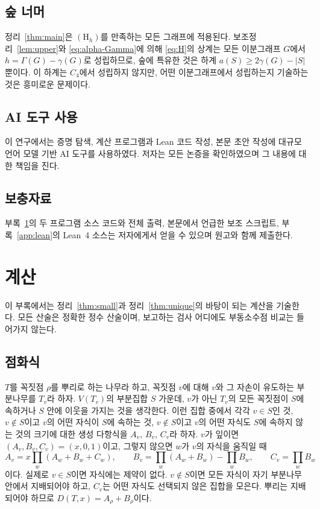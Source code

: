 \documentclass[11pt,a4paper]{article}
\theoremstyle{definition}
\begin{document}
\subsection*{숲 너머}
정리~\ref{thm:main}은 $(\mathrm{H}_h)$를 만족하는 모든 그래프에 적용된다.
보조정리~\ref{lem:upper}와 \eqref{eq:alpha-Gamma}에 의해 \eqref{eq:H}의 상계는 모든
이분그래프 $G$에서 $h=\Gamma(G)-\gamma(G)$로 성립하므로, 숲에 특유한 것은 하계
$a(S)\ge2\gamma(G)-|S|$뿐이다. 이 하계는 $C_4$에서 성립하지 않지만, 어떤 이분그래프에서
성립하는지 기술하는 것은 흥미로운 문제이다.

\subsection*{AI 도구 사용}
이 연구에서는 증명 탐색, 계산 프로그램과 Lean 코드 작성, 본문 초안 작성에 대규모 언어
모델 기반 AI 도구를 사용하였다. 저자는 모든 논증을 확인하였으며 그 내용에 대한 책임을
진다.

\subsection*{보충자료}
부록~\ref{app:computation}의 두 프로그램 소스 코드와 전체 출력, 본문에서 언급한 보조
스크립트, 부록~\ref{app:lean}의 Lean~4 소스는 저자에게서 얻을 수 있으며 원고와 함께
제출한다.

\appendix
\section{계산}\label{app:computation}

이 부록에서는 정리~\ref{thm:small}과 정리~\ref{thm:unique}의 바탕이 되는 계산을
기술한다. 모든 산술은 정확한 정수 산술이며, 보고하는 검사 어디에도 부동소수점 비교는
들어가지 않는다.

\subsection*{점화식}
$T$를 꼭짓점 $\rho$를 뿌리로 하는 나무라 하고, 꼭짓점 $v$에 대해 $v$와 그 자손이
유도하는 부분나무를 $T_v$라 하자. $V(T_v)$의 부분집합 $S$ 가운데, $v$가 아닌 $T_v$의
모든 꼭짓점이 $S$에 속하거나 $S$ 안에 이웃을 가지는 것을 생각한다. 이런 집합 중에서
각각 $v\in S$인 것, $v\notin S$이고 $v$의 어떤 자식이 $S$에 속하는 것, $v\notin S$이고
$v$의 어떤 자식도 $S$에 속하지 않는 것의 크기에 대한 생성 다항식을 $A_v$, $B_v$,
$C_v$라 하자. $v$가 잎이면 $(A_v,B_v,C_v)=(x,0,1)$이고, 그렇지 않으면 $w$가 $v$의
자식을 움직일 때
\begin{equation}\label{eq:dp}
  A_v=x\prod_w(A_w+B_w+C_w),\qquad
  B_v=\prod_w(A_w+B_w)-\prod_w B_w,\qquad
  C_v=\prod_w B_w
\end{equation}
이다. 실제로 $v\in S$이면 자식에는 제약이 없다. $v\notin S$이면 모든 자식이 자기
부분나무 안에서 지배되어야 하고, $C_v$는 어떤 자식도 선택되지 않은 집합을 모은다.
뿌리는 지배되어야 하므로 $D(T,x)=A_\rho+B_\rho$이다.
\end{document}
